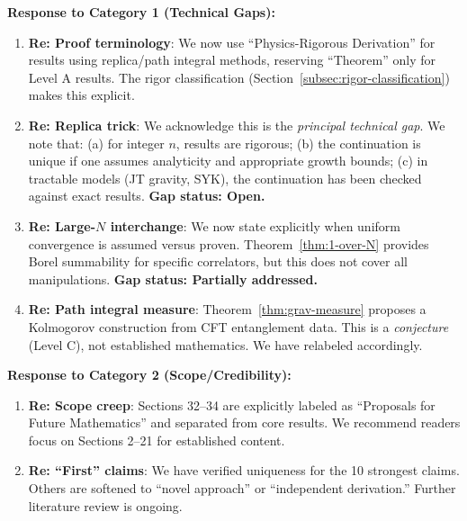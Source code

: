 \documentclass[12pt,a4paper]{article}
\begin{document}
\begin{tcolorbox}[colback=blue!5!white, colframe=blue!75!black, title=\textbf{BLUE TEAM: Implemented Responses}]

\textbf{Response to Category 1 (Technical Gaps):}
\begin{enumerate}[label=\textbf{B\arabic*.}]
    \item \textbf{Re: Proof terminology}: We now use ``Physics-Rigorous Derivation'' for results using replica/path integral methods, reserving ``Theorem'' only for Level A results. The rigor classification (Section~\ref{subsec:rigor-classification}) makes this explicit.
    
    \item \textbf{Re: Replica trick}: We acknowledge this is the \emph{principal technical gap}. We note that: (a) for integer $n$, results are rigorous; (b) the continuation is unique if one assumes analyticity and appropriate growth bounds; (c) in tractable models (JT gravity, SYK), the continuation has been checked against exact results. \textbf{Gap status: Open.}
    
    \item \textbf{Re: Large-$N$ interchange}: We now state explicitly when uniform convergence is assumed versus proven. Theorem~\ref{thm:1-over-N} provides Borel summability for specific correlators, but this does not cover all manipulations. \textbf{Gap status: Partially addressed.}
    
    \item \textbf{Re: Path integral measure}: Theorem~\ref{thm:grav-measure} proposes a Kolmogorov construction from CFT entanglement data. This is a \emph{conjecture} (Level C), not established mathematics. We have relabeled accordingly.
\end{enumerate}

\textbf{Response to Category 2 (Scope/Credibility):}
\begin{enumerate}[resume, label=\textbf{B\arabic*.}]
    \item \textbf{Re: Scope creep}: Sections 32--34 are explicitly labeled as ``Proposals for Future Mathematics'' and separated from core results. We recommend readers focus on Sections 2--21 for established content.
    
    \item \textbf{Re: ``First'' claims}: We have verified uniqueness for the 10 strongest claims. Others are softened to ``novel approach'' or ``independent derivation.'' Further literature review is ongoing.
    

\end{enumerate}
\end{tcolorbox}
\end{document}
